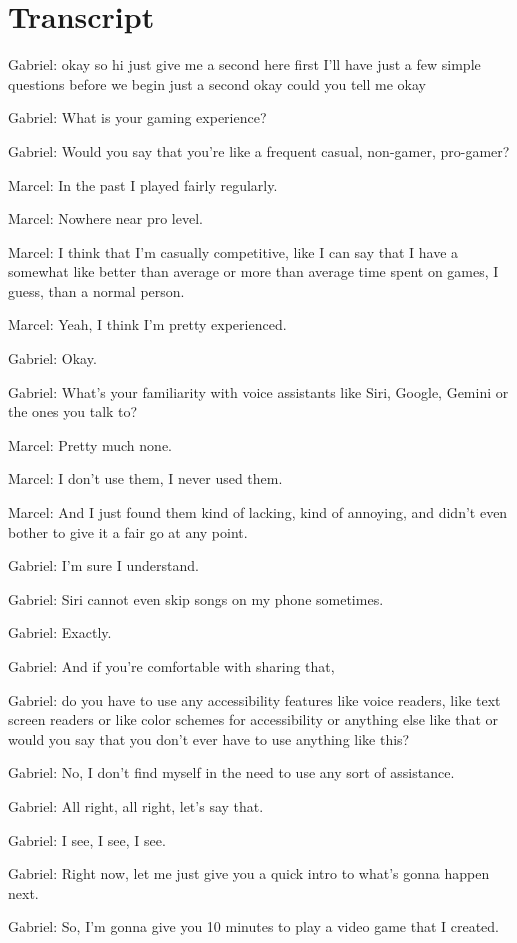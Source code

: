 \section{Transcript}
Gabriel: okay so hi just give me a second here first I'll have just a few simple questions before we begin just a second okay could you tell me okay

Gabriel: What is your gaming experience?

Gabriel: Would you say that you're like a frequent casual, non-gamer, pro-gamer?

Marcel: In the past I played fairly regularly.

Marcel: Nowhere near pro level.

Marcel: I think that I'm casually competitive, like I can say that I have a somewhat like better than average or more than average time spent on games, I guess, than a normal person.

Marcel: Yeah, I think I'm pretty experienced.

Gabriel: Okay.

Gabriel: What's your familiarity with voice assistants like Siri, Google, Gemini or the ones you talk to?

Marcel: Pretty much none.

Marcel: I don't use them, I never used them.

Marcel: And I just found them kind of lacking, kind of annoying, and didn't even bother to give it a fair go at any point.

Gabriel: I'm sure I understand.

Gabriel: Siri cannot even skip songs on my phone sometimes.

Gabriel: Exactly.

Gabriel: And if you're comfortable with sharing that,

Gabriel: do you have to use any accessibility features like voice readers, like text screen readers or like color schemes for accessibility or anything else like that or would you say that you don't ever have to use anything like this?

Gabriel: No, I don't find myself in the need to use any sort of assistance.

Gabriel: All right, all right, let's say that.

Gabriel: I see, I see, I see.

Gabriel: Right now, let me just give you a quick intro to what's gonna happen next.

Gabriel: So, I'm gonna give you 10 minutes to play a video game that I created.

